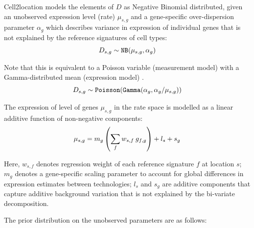 \documentclass[11pt,a4paper]{article}
\begin{document}
Cell2location models the elements of $D$ as Negative Binomial distributed, given an unobserved expression level (rate) $\mu_{s,g}$ and a gene-specific over-dispersion parameter $\alpha_g$ which describes variance in expression of individual genes that is not explained by the reference signatures of cell types: 
\begin{equation} \label{eq:c2l:1}
D_{s,g} \sim \mathtt{NB}(\mu_{s,g}, \alpha_g) \\
\end{equation}

Note that this is equivalent to a Poisson variable (measurement model) with a Gamma-distributed mean (expression model)
\cite{sarkar_separating_2020}.
\begin{equation} \label{eq:c2l:1}
D_{s,g} \sim \mathtt{Poisson}(\mathtt{Gamma}(\alpha_g, \alpha_g / \mu_{s,g})) \\
\end{equation}

The expression of level of genes $\mu_{s,g}$ in the rate space is modelled as a linear additive function of non-negative components:
\begin{equation} \label{eq:c2l:3}
\mu_{s,g} = m_{g} \left (\sum_{f} {w_{s,f} \: g_{f,g}} \right) + l_s + s_{g}\\
\end{equation}

Here, $w_{s,f}$ denotes regression weight of each reference signature $f$ at location $s$; 
$m_{g}$ denotes a gene-specific scaling parameter to account for global differences in expression estimates between technologies;
$l_{s}$ and $s_{g}$ are additive components that capture additive background variation that is not explained by the bi-variate decomposition.

The prior distribution on the unobserved parameters are as follows:
\end{document}
